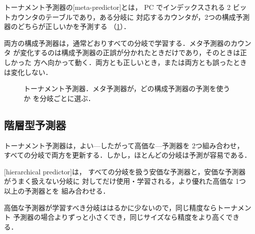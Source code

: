 \documentclass[../main.tex]{subfiles}
\begin{document}
\begin{definition}[メタ予測器]
  トーナメント予測器の[meta-predictor]とは，
  PC でインデックスされる 2 ビットカウンタのテーブルであり，ある分岐に
  対応するカウンタが，2つの構成予測器のどちらが正しいかを予測する
  （\cref{fig:l04-tournament}）．
\end{definition}

両方の構成予測器は，通常どおりすべての分岐で学習する．メタ予測器のカウンタ
が変化するのは構成予測器の正誤が分かれたときだけであり，そのときは正しかった
方へ向かって動く．両方とも正しいとき，または両方とも誤ったときは変化しない．

\begin{figure}[htbp]
  \centering
  
  \caption{トーナメント予測器．メタ予測器が，どの構成予測器の予測を使うか
    を分岐ごとに選ぶ．}
  \label{fig:l04-tournament}
\end{figure}

\subsection{階層型予測器}

トーナメント予測器は，よい---したがって高価な---予測器を 2つ組み合わせ，
すべての分岐で両方を更新する．しかし，ほとんどの分岐は予測が容易である．

\begin{definition}[階層型予測器]
  [hierarchical predictor]は，
  すべての分岐を扱う安価な予測器と，安価な予測器がうまく扱えない分岐に
  対してだけ使用・学習される，より優れた高価な 1つ以上の予測器とを
  組み合わせる．
\end{definition}

高価な予測器が学習すべき分岐ははるかに少ないので，同じ精度ならトーナメント
予測器の場合よりずっと小さくでき，同じサイズなら精度をより高くできる．
\end{document}
